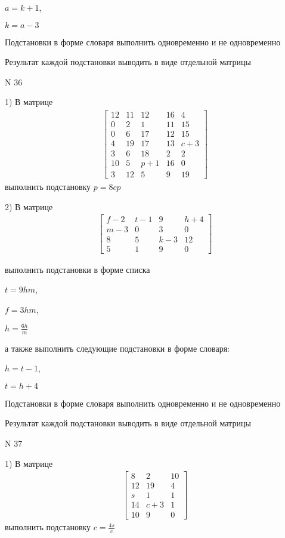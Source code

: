 \documentclass[11pt]{report}
\begin{document}
$a=k + 1$,

$k=a - 3$


    Подстановки в форме словаря выполнить одновременно и не одновременно


    Результат каждой подстановки выводить в виде отдельной матрицы

\newpage
N 36


    1) В матрице
\begin{align*}
\left[\begin{matrix}12 & 11 & 12 & 16 & 4\\0 & 2 & 1 & 11 & 15\\0 & 6 & 17 & 12 & 15\\4 & 19 & 17 & 13 & c + 3\\3 & 6 & 18 & 2 & 2\\10 & 5 & p + 1 & 16 & 0\\3 & 12 & 5 & 9 & 19\end{matrix}\right]
\end{align*}
выполнить подстановку $p=8 c p$


    2) В матрице
\begin{align*}
\left[\begin{matrix}f - 2 & t - 1 & 9 & h + 4\\m - 3 & 0 & 3 & 0\\8 & 5 & k - 3 & 12\\5 & 1 & 9 & 0\end{matrix}\right]
\end{align*}

выполнить подстановки в форме списка

$t=9 h m$,

$f=3 h m$,

$h=\frac{6 h}{m}$

а также выполнить следующие подстановки в форме словаря:

$h=t - 1$,

$t=h + 4$


    Подстановки в форме словаря выполнить одновременно и не одновременно


    Результат каждой подстановки выводить в виде отдельной матрицы

\newpage
N 37


    1) В матрице
\begin{align*}
\left[\begin{matrix}8 & 2 & 10\\12 & 19 & 4\\s & 1 & 1\\14 & c + 3 & 1\\10 & 9 & 0\end{matrix}\right]
\end{align*}
выполнить подстановку $c=\frac{4 s}{c}$
\end{document}
